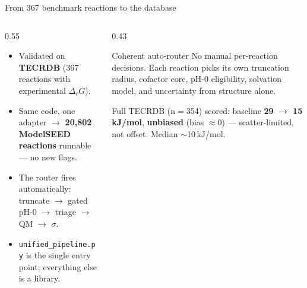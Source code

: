 \documentclass[aspectratio=169,11pt]{beamer}
\newcommand{\kj}{\,kJ/mol}
\newcommand{\arw}{$\rightarrow$}
\begin{document}
\begin{frame}{From 367 benchmark reactions to the database}
  \begin{columns}[T]
    \begin{column}{0.55\textwidth}
      \begin{itemize}
        \item Validated on \textbf{TECRDB} (367 reactions with experimental $\Delta_r G$).
        \item Same code, one adapter \arw{} \textbf{20{,}802 ModelSEED reactions} runnable — no new flags.
        \item The router fires automatically: truncate \arw{} gated pH-0 \arw{} triage \arw{} QM \arw{} $\sigma$.
        \item \texttt{unified\_pipeline.py} is the single entry point; everything else is a library.
      \end{itemize}
    \end{column}
    \begin{column}{0.43\textwidth}
      \begin{block}{Coherent auto-router}
        \footnotesize No manual per-reaction decisions. Each reaction picks its own truncation
        radius, cofactor core, pH-0 eligibility, solvation model, and uncertainty from structure alone.
      \end{block}
      {\scriptsize Full TECRDB (n$=$354) scored: baseline \textbf{29 \arw{} 15\kj}, \textbf{unbiased}
      (bias $\approx 0$) --- scatter-limited, not offset. Median $\sim$10\kj.}
    \end{column}
  \end{columns}
\end{frame}
\end{document}
